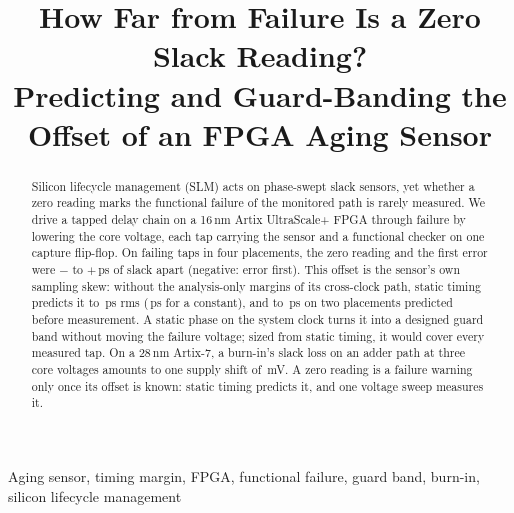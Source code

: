 \documentclass[conference]{IEEEtran}
\newif\ifblind \blindfalse
\begin{document}
\title{How Far from Failure Is a Zero Slack Reading?\\ Predicting and Guard-Banding the Offset of
an FPGA Aging Sensor}

\ifblind
\author{\IEEEauthorblockN{Anonymous authors}\IEEEauthorblockA{Affiliation withheld for review}}
\else
\author{
}
\fi

\maketitle

\begin{abstract}
Silicon lifecycle management (SLM) acts on phase-swept slack sensors, yet whether a zero reading
marks the functional failure of the monitored path is rarely measured. We drive a tapped delay chain
on a 16\,nm Artix UltraScale+ FPGA through failure by lowering the core voltage, each tap carrying
the sensor and a functional checker on one capture flip-flop. On \vAllN{} failing taps in four
placements, the zero reading and the first error were $-$\vAllMinPsAbs{} to $+$\vAllMaxPsAbs\,ps of
slack apart (negative: error first). This offset is the sensor's own sampling skew: without the
analysis-only margins of its cross-clock path, static timing predicts it to \vAllRms\,ps rms
(\vAllNullRms\,ps for a constant), and to \vCDRms\,ps on two placements predicted before
measurement. A static phase on the system clock turns it into a designed guard band without moving
the failure voltage; sized from static timing, it would cover every measured tap. On a 28\,nm
Artix-7, a burn-in's slack loss on an adder path at three core voltages amounts to one supply shift
of \vShiftmV\,mV. A zero reading is a failure warning only once its offset is known: static timing
predicts it, and one voltage sweep measures it.
\end{abstract}

\begin{IEEEkeywords}
Aging sensor, timing margin, FPGA, functional failure, guard band, burn-in, silicon lifecycle
management
\end{IEEEkeywords}
\end{document}
